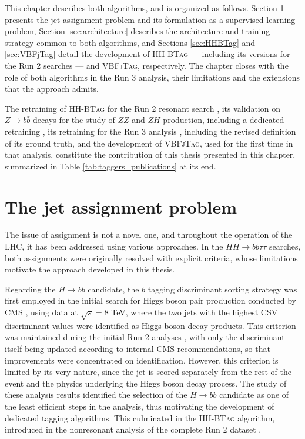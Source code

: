 This chapter describes both algorithms, and is organized as follows. Section \ref{sec:assignment} presents the jet assignment problem and its formulation as a supervised learning problem, Section \ref{sec:architecture} describes the architecture and training strategy common to both algorithms, and Sections \ref{sec:HHBTag} and \ref{sec:VBFjTag} detail the development of \textsc{HH-BTag} — including its versions for the Run 2 searches — and \textsc{VBFjTag}, respectively. The chapter closes with the role of both algorithms in the Run 3 analysis, their limitations and the extensions that the approach admits.\medskip


\noindent The retraining of \textsc{HH-BTag} for the Run 2 resonant search \cite{CMS-PAS-B2G-24-011}, its validation on $Z\to b\bar{b}$ decays for the study of $ZZ$ and $ZH$ production, including a dedicated retraining \cite{CMS:2026zzzh}, its retraining for the Run 3 analysis \cite{CMS-PAS-HIG-25-008}, including the revised definition of its ground truth, and the development of \textsc{VBFjTag}, used for the first time in that analysis, constitute the contribution of this thesis presented in this chapter, summarized in Table \ref{tab:taggers_publications} at its end.




\section{The jet assignment problem}
\label{sec:assignment}
%
The issue of assignment is not a novel one, and throughout the operation of the LHC, it has been addressed using various approaches. In the $HH\to bb\tau\tau$ searches, both assignments were originally resolved with explicit criteria, whose limitations motivate the approach developed in this thesis.\medskip

Regarding the $H\rightarrow b\bar{b}$ candidate, the $b$ tagging discriminant sorting strategy was first employed in the initial search for Higgs boson pair production conducted by CMS \cite{CMS-HIG-15-013}, using data at $\sqrt{s} = 8$ TeV, where the two jets with the highest CSV discriminant values \cite{CMS-BTV-12-001} were identified as Higgs boson decay products. This criterion was maintained during the initial Run 2 analyses \cite{CMS:2018bbtt}, with only the discriminant itself being updated according to internal CMS recommendations, so that improvements were concentrated on identification. However, this criterion is limited by its very nature, since the jet is scored separately from the rest of the event and the physics underlying the Higgs boson decay process. The study of these analysis results identified the selection of the $H\rightarrow b\bar{b}$ candidate as one of the least efficient steps in the analysis, thus motivating the development of dedicated tagging algorithms. This culminated in the \textsc{HH-BTag} algorithm, introduced in the nonresonant analysis of the complete Run 2 dataset \cite{CMS-HIG-20-010}.

